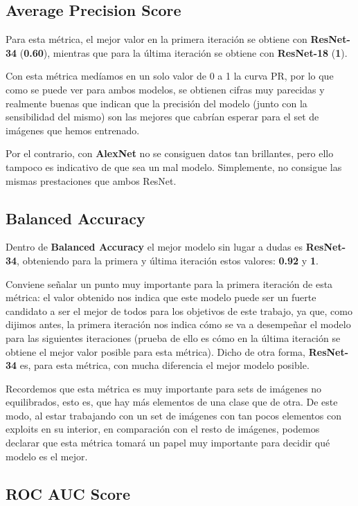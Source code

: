 \subsection{Average Precision Score}

Para esta métrica, el mejor valor en la primera iteración se obtiene con \textbf{ResNet-34} (\textbf{0.60}), mientras que para la última iteración se obtiene con \textbf{ResNet-18} (\textbf{1}).

Con esta métrica medíamos en un solo valor de 0 a 1 la curva \ac{PR}, por lo que como se puede ver para ambos modelos, se obtienen cifras muy parecidas y realmente buenas que indican que la precisión del modelo (junto con la sensibilidad del mismo) son las mejores que cabrían esperar para el set de imágenes que hemos entrenado.

Por el contrario, con \textbf{AlexNet} no se consiguen datos tan brillantes, pero ello tampoco es indicativo de que sea un mal modelo. Simplemente, no consigue las mismas prestaciones que ambos ResNet.

\subsection{Balanced Accuracy}

Dentro de \textbf{Balanced Accuracy} el mejor modelo sin lugar a dudas es \textbf{ResNet-34}, obteniendo para la primera y última iteración estos valores: \textbf{0.92} y \textbf{1}.

Conviene señalar un punto muy importante para la primera iteración de esta métrica: el valor obtenido nos indica que este modelo puede ser un fuerte candidato a ser el mejor de todos para los objetivos de este trabajo, ya que, como dijimos antes, la primera iteración nos indica cómo se va a desempeñar el modelo para las siguientes iteraciones (prueba de ello es cómo en la última iteración se obtiene el mejor valor posible para esta métrica). Dicho de otra forma, \textbf{ResNet-34} es, para esta métrica, con mucha diferencia el mejor modelo posible.

Recordemos que esta métrica es muy importante para sets de imágenes no equilibrados, esto es, que hay más elementos de una clase que de otra. De este modo, al estar trabajando con un set de imágenes con tan pocos elementos con exploits en su interior, en comparación con el resto de imágenes, podemos declarar que esta métrica tomará un papel muy importante para decidir qué modelo es el mejor.

\subsection{ROC AUC Score}

